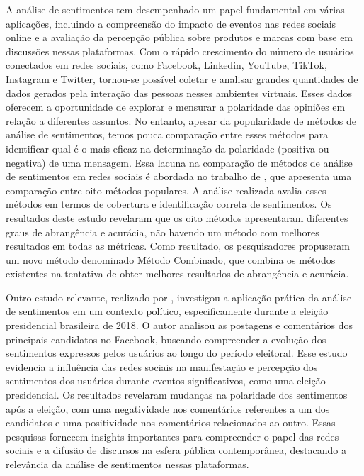 \documentclass[manuscript,screen,review]{acmart}
\begin{document}
A análise de sentimentos tem desempenhado um papel fundamental em várias aplicações, incluindo a compreensão do impacto de eventos nas redes sociais online e a avaliação da percepção pública sobre produtos e marcas com base em discussões nessas plataformas. Com o rápido crescimento do número de usuários conectados em redes sociais, como Facebook, Linkedin, YouTube, TikTok, Instagram e Twitter, tornou-se possível coletar e analisar grandes quantidades de dados gerados pela interação das pessoas nesses ambientes virtuais. Esses dados oferecem a oportunidade de explorar e mensurar a polaridade das opiniões em relação a diferentes assuntos. No entanto, apesar da popularidade de métodos de análise de sentimentos, temos pouca comparação entre esses métodos para identificar qual é o mais eficaz na determinação da polaridade (positiva ou negativa) de uma mensagem. Essa lacuna na comparação de métodos de análise de sentimentos em redes sociais é abordada no trabalho de \cite{araujo2013}, que apresenta uma comparação entre oito métodos populares. A análise realizada avalia esses métodos em termos de cobertura e identificação correta de sentimentos. Os resultados deste estudo revelaram que os oito métodos apresentaram diferentes graus de abrangência e acurácia, não havendo um método com melhores resultados em todas as métricas. Como resultado, os pesquisadores propuseram um novo método denominado Método Combinado, que combina os métodos existentes na tentativa de obter melhores resultados de abrangência e acurácia.

Outro estudo relevante, realizado por \cite{oliveira2021}, investigou a aplicação prática da análise de sentimentos em um contexto político, especificamente durante a eleição presidencial brasileira de 2018. O autor analisou as postagens e comentários dos principais candidatos no Facebook, buscando compreender a evolução dos sentimentos expressos pelos usuários ao longo do período eleitoral. Esse estudo evidencia a influência das redes sociais na manifestação e percepção dos sentimentos dos usuários durante eventos significativos, como uma eleição presidencial. Os resultados revelaram mudanças na polaridade dos sentimentos após a eleição, com uma negatividade nos comentários referentes a um dos candidatos e uma positividade nos comentários relacionados ao outro. Essas pesquisas fornecem insights importantes para compreender o papel das redes sociais e a difusão de discursos na esfera pública contemporânea, destacando a relevância da análise de sentimentos nessas plataformas.
\end{document}
